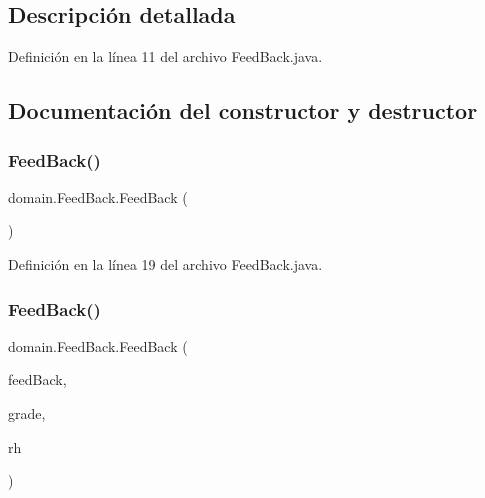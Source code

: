 \subsection{Descripción detallada}


Definición en la línea 11 del archivo Feed\+Back.\+java.



\subsection{Documentación del constructor y destructor}
\mbox{\label{classdomain_1_1_feed_back_a35a311801c50115ea7fc9685581900b9}} 
\subsubsection{\texorpdfstring{FeedBack()}{FeedBack()}\hspace{0.1cm}{\footnotesize\ttfamily [1/2]}}
{\footnotesize\ttfamily domain.\+Feed\+Back.\+Feed\+Back (\begin{DoxyParamCaption}{ }\end{DoxyParamCaption})}



Definición en la línea 19 del archivo Feed\+Back.\+java.


\begin{DoxyCode}{0}

\end{DoxyCode}
\mbox{\label{classdomain_1_1_feed_back_af677d71a2a42fa66f07889b4e7ace5b3}} 
\subsubsection{\texorpdfstring{FeedBack()}{FeedBack()}\hspace{0.1cm}{\footnotesize\ttfamily [2/2]}}
{\footnotesize\ttfamily domain.\+Feed\+Back.\+Feed\+Back (\begin{DoxyParamCaption}\item[{String}]{feed\+Back,  }\item[{int}]{grade,  }\item[{\mbox{\hyperlink{classdomain_1_1_rural_house}{Rural\+House}}}]{rh }\end{DoxyParamCaption})}



